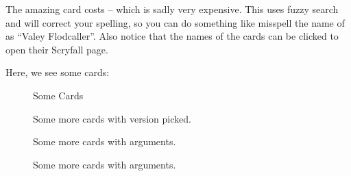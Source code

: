 \documentclass[a4paper]{scrartcl}
\begin{document}
	The amazing card  costs  -- which is sadly very expensive.
	This uses fuzzy search and will correct your spelling, so you can do something like misspell the name of  as \enquote{Valey Flodcaller}.
	Also notice that the names of the cards can be clicked to open their Scryfall page.

	Here, we see some cards:
	\begin{figure}[h]
		\caption{Some Cards}
	\end{figure}
	\mtgsetcardwidth{6.5cm}

	\begin{figure}[h]
		\caption{Some more cards with version picked.}
	\end{figure}

	\begin{figure}[h]
		\caption{Some more cards with arguments.}
	\end{figure}

	\mtgsetcardwidth{5cm}
	\begin{figure}[h]
		\caption{Some more cards with arguments.}
	\end{figure}
\end{document}
